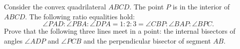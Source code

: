 Consider the convex quadrilateral $ABCD$.
The point $P$ is in the interior of $ABCD$.
The following ratio equalities hold:
\[\angle PAD:\angle PBA:\angle DPA
  = 1:2:3
  = \angle CBP:\angle BAP:\angle BPC.\]
Prove that the following three lines meet in a point:
the internal bisectors of angles $\angle ADP$ and $\angle PCB$
and the perpendicular bisector of segment $AB$.
